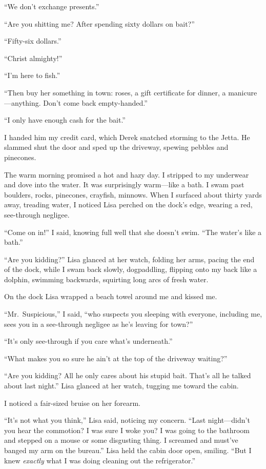 ``We don't exchange presents.''

``Are you shitting me? After spending sixty dollars on bait?''

``Fifty-six dollars.''

``Christ almighty!''

``I'm here to fish.''

``Then buy her something in town: roses, a gift certificate for dinner,
a manicure---anything. Don't come back empty-handed.''

``I only have enough cash for the bait.''

I handed him my credit card, which Derek snatched storming to the Jetta.
He slammed shut the door and sped up the driveway, spewing pebbles and
pinecones.

The warm morning promised a hot and hazy day. I stripped to my underwear
and dove into the water. It was surprisingly warm---like a bath. I swam
past boulders, rocks, pinecones, crayfish, minnows. When I surfaced
about thirty yards away, treading water, I noticed Lisa perched on the
dock's edge, wearing a red, see-through negligee.

``Come on in!'' I said, knowing full well that she doesn't swim. ``The
water's like a bath.''

``Are you kidding?'' Lisa glanced at her watch, folding her arms, pacing
the end of the dock, while I swam back slowly, dogpaddling, flipping
onto my back like a dolphin, swimming backwards, squirting long arcs of
fresh water.

On the dock Lisa wrapped a beach towel around me and kissed me.

``Mr.~Suspicious,'' I said, ``who suspects you sleeping with everyone,
including me, sees you in a see-through negligee as he's leaving for
town?''

``It's only see-through if you care what's underneath.''

``What makes you so sure he ain't at the top of the driveway waiting?''

``Are you kidding? All he only cares about his stupid bait. That's all
he talked about last night.'' Lisa glanced at her watch, tugging me
toward the cabin.

I noticed a fair-sized bruise on her forearm.

``It's not what you think,'' Lisa said, noticing my concern. ``Last
night---didn't you hear the commotion? I was sure I woke you? I was
going to the bathroom and stepped on a mouse or some disgusting thing. I
screamed and must've banged my arm on the bureau.'' Lisa held the cabin
door open, smiling. ``But I knew \emph{exactly} what I was doing
cleaning out the refrigerator.''

